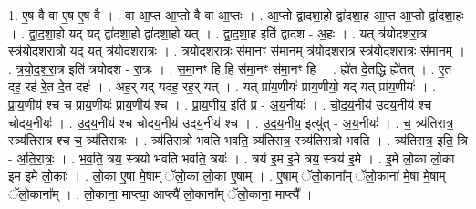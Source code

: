 \documentclass[17pt]{extarticle}
\begin{document}
1. ए॒ष वै वा ए॒ष ए॒ष वै । . वा आ॒प्त आ॒प्तो वै वा आ॒प्तः । . आ॒प्तो द्वा॑दशा॒हो द्वा॑दशा॒ह आ॒प्त आ॒प्तो द्वा॑दशा॒हः । . द्वा॒द॒शा॒हो यद् यद् द्वा॑दशा॒हो द्वा॑दशा॒हो यत् । . द्वा॒द॒शा॒ह इति॑ द्वादश - अ॒हः । . यत् त्र॑योदशरा॒त्र स्त्र॑योदशरा॒त्रो यद् यत् त्र॑योदशरा॒त्रः । . त्र॒यो॒द॒श॒रा॒त्रः स॑मा॒नꣳ स॑मा॒नम् त्र॑योदशरा॒त्र स्त्र॑योदशरा॒त्रः स॑मा॒नम् । . त्र॒यो॒द॒श॒रा॒त्र इति॑ त्रयोदश - रा॒त्रः । . स॒मा॒नꣳ हि हि स॑मा॒नꣳ स॑मा॒नꣳ हि । . ह्ये॑त दे॒तद्धि ह्ये॑तत् । . ए॒त दह॒ रह॑ रे॒त दे॒त दहः॑ । . अह॒र् यद् यदह॒ रह॒र् यत् । . यत् प्रा॑य॒णीयः॑ प्राय॒णीयो॒ यद् यत् प्रा॑य॒णीयः॑ । . प्रा॒य॒णीय॑ श्च च प्राय॒णीयः॑ प्राय॒णीय॑ श्च । . प्रा॒य॒णीय॒ इति॑ प्र - अ॒य॒नीयः॑ । . चो॒द॒य॒नीय॑ उदय॒नीय॑ श्च चोदय॒नीयः॑ । . उ॒द॒य॒नीय॑ श्च चोदय॒नीय॑ उदय॒नीय॑ श्च । . उ॒द॒य॒नीय॒ इत्यु॑त् - अ॒य॒नीयः॑ । . च॒ त्र्य॑तिरात्र॒ स्त्र्य॑तिरात्र श्च च॒ त्र्य॑तिरात्रः । . त्र्य॑तिरात्रो भवति भवति॒ त्र्य॑तिरात्र॒ स्त्र्य॑तिरात्रो भवति । . त्र्य॑तिरात्र॒ इति॒ त्रि - अ॒ति॒रा॒त्रः॒ । . भ॒व॒ति॒ त्रय॒ स्त्रयो॑ भवति भवति॒ त्रयः॑ । . त्रय॑ इ॒म इ॒मे त्रय॒ स्त्रय॑ इ॒मे । . इ॒मे लो॒का लो॒का इ॒म इ॒मे लो॒काः । . लो॒का ए॒षा मे॒षाम् ॅलो॒का लो॒का ए॒षाम् । . ए॒षाम् ॅलो॒काना᳚म् ॅलो॒काना॑ मे॒षा मे॒षाम् ॅलो॒काना᳚म् । . लो॒काना॒ माप्त्या॒ आप्त्यै॑ लो॒काना᳚म् ॅलो॒काना॒ माप्त्यै᳚ । \newline
\end{document}

